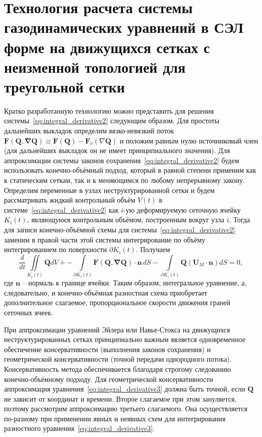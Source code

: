 \section{Технология расчета системы газодинамических уравнений в СЭЛ форме на движущихся сетках с неизменной топологией для треугольной сетки}
Кратко разработанную технологию можно представить для решения системы~\eqref{eq:integral_derivative2} следующим образом. Для простоты дальнейших выкладок определим вязко-невязкий поток  $\mathbf{F(Q, \nabla Q)} \equiv \mathbf{F(Q)} - \mathbf{F}_{\nu}( \nabla \mathbf{Q})$  и положим равным нулю источниковый член (для дальнейших выкладок он не имеет принципиального значения). Для аппроксимации системы законов сохранения~\eqref{eq:integral_derivative2} будем использовать конечно-объёмный подход, который в равной степени применим как к статическим сеткам, так и к меняющимся по любому непрерывному закону. Определим переменные в узлах неструктурированной сетки и будем рассматривать жидкий контрольный объём $V(t)$  в системе~\eqref{eq:integral_derivative2} как $i$-ую деформируемую сеточную ячейку $K_i(t)$, являющуюся контрольным объёмом, построенным вокруг узла $i$. Тогда для записи конечно-объёмной схемы для системы~\eqref{eq:integral_derivative2} заменим в правой части этой системы интегрирование по объёму интегрированием по поверхности  $\partial K_i(t)$. Получаем
\begin{equation}\label{eq:integral_derivative3}
\frac{d}{dt}\iint \limits_{K_i(t)} \mathbf{Q}dV + 
-\int \limits_{\partial K_i(t)}\mathbf{F(Q, \nabla Q)} \cdot \mathbf{n} \,dS - 
\int \limits_{\partial K_i(t)}\mathbf{Q}(\mathbf{U}_M\cdot \mathbf{n})dS = 0 ,
\end{equation}
где  $\mathbf{n}$ – нормаль к границе ячейки. Таким образом, интегральное уравнение, а, следовательно, и конечно-объёмная разностная схема приобретает дополнительное слагаемое, пропорциональное скорости движения граней сеточных ячеек.

При аппроксимации уравнений Эйлера или Навье-Стокса на движущихся неструктурированных сетках принципиально важным является одновременное обеспечение консервативности (выполнения законов сохранения) и геометрической консервативности (точной передачи однородного потока). Консервативность метода обеспечивается благодаря строгому следованию конечно-объёмному подходу. Для геометрической консервативности  аппроксимация уравнения~\eqref{eq:integral_derivative3} должна быть точной, если  $\mathbf{Q}$ не зависит от координат и времени. Второе слагаемое при этом зануляется, поэтому рассмотрим аппроксимацию третьего слагаемого. Она осуществляется по-разному при применении явных и неявных схем для интегрирования разностного уравнения~\eqref{eq:integral_derivative3}.

